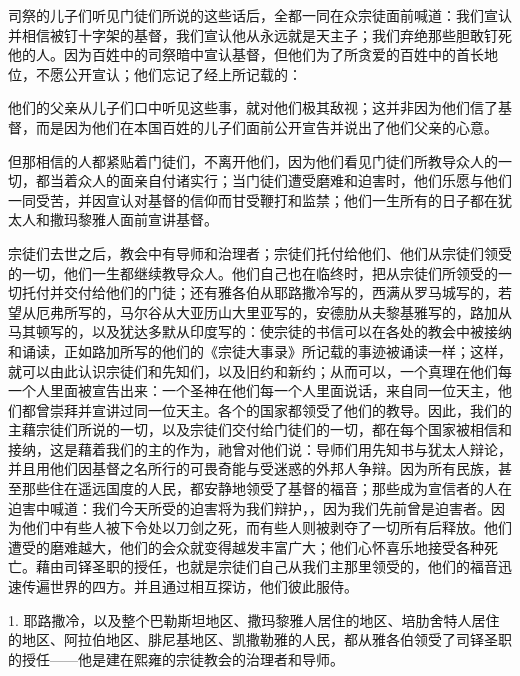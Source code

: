 司祭的儿子们听见门徒们所说的这些话后，全都一同在众宗徒面前喊道：我们宣认并相信被钉十字架的基督，我们宣认他从永远就是天主子；我们弃绝那些胆敢钉死他的人。因为百姓中的司祭暗中宣认基督，但他们为了所贪爱的百姓中的首长地位，不愿公开宣认；他们忘记了经上所记载的：\par

他们的父亲从儿子们口中听见这些事，就对他们极其敌视；这并非因为他们信了基督，而是因为他们在本国百姓的儿子们面前公开宣告并说出了他们父亲的心意。\par

但那相信的人都紧贴着门徒们，不离开他们，因为他们看见门徒们所教导众人的一切，都当着众人的面亲自付诸实行；当门徒们遭受磨难和迫害时，他们乐愿与他们一同受苦，并因宣认对基督的信仰而甘受鞭打和监禁；他们一生所有的日子都在犹太人和撒玛黎雅人面前宣讲基督。\par

宗徒们去世之后，教会中有导师和治理者；宗徒们托付给他们、他们从宗徒们领受的一切，他们一生都继续教导众人。他们自己也在临终时，把从宗徒们所领受的一切托付并交付给他们的门徒；还有雅各伯从耶路撒冷写的，西满从罗马城写的，若望从厄弗所写的，马尔谷从大亚历山大里亚写的，安德肋从夫黎基雅写的，路加从马其顿写的，以及犹达多默从印度写的：使宗徒的书信可以在各处的教会中被接纳和诵读，正如路加所写的他们的《宗徒大事录》所记载的事迹被诵读一样；这样，就可以由此认识宗徒们和先知们，以及旧约和新约；从而可以，一个真理在他们每一个人里面被宣告出来：一个圣神在他们每一个人里面说话，来自同一位天主，他们都曾崇拜并宣讲过同一位天主。各个的国家都领受了他们的教导。因此，我们的主藉宗徒们所说的一切，以及宗徒们交付给门徒们的一切，都在每个国家被相信和接纳，这是藉着我们的主的作为，祂曾对他们说：导师们用先知书与犹太人辩论，并且用他们因基督之名所行的可畏奇能与受迷惑的外邦人争辩。因为所有民族，甚至那些住在遥远国度的人民，都安静地领受了基督的福音；那些成为宣信者的人在迫害中喊道：我们今天所受的迫害将为我们辩护，，因为我们先前曾是迫害者。因为他们中有些人被下令处以刀剑之死，而有些人则被剥夺了一切所有后释放。他们遭受的磨难越大，他们的会众就变得越发丰富广大；他们心怀喜乐地接受各种死亡。藉由司铎圣职的授任，也就是宗徒们自己从我们主那里领受的，他们的福音迅速传遍世界的四方。并且通过相互探访，他们彼此服侍。\par

1. 耶路撒冷，以及整个巴勒斯坦地区、撒玛黎雅人居住的地区、培肋舍特人居住的地区、阿拉伯地区、腓尼基地区、凯撒勒雅的人民，都从雅各伯领受了司铎圣职的授任——他是建在熙雍的宗徒教会的治理者和导师。\par

